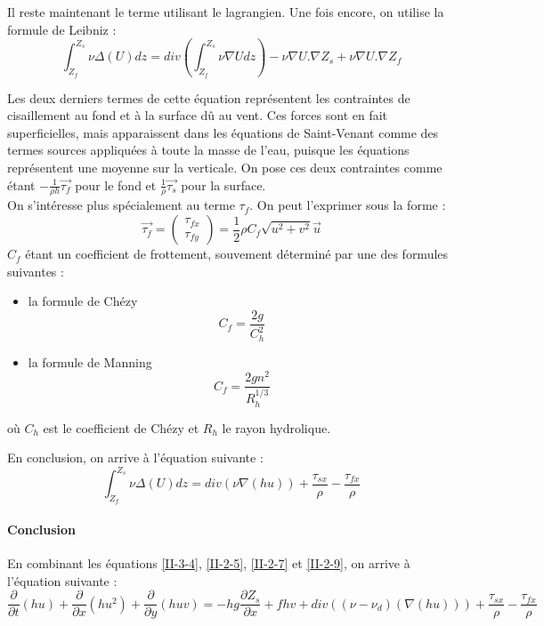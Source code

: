 \bigskip
Il reste maintenant le terme utilisant le lagrangien. Une fois encore, on utilise la formule de Leibniz :
\[\int_{Z_f}^{Z_s} \nu \Delta(U) dz = div\left( \int_{Z_f}^{Z_s} \nu \nabla U dz \right) - \nu \nabla U . \nabla Z_s + \nu \nabla U . \nabla Z_f\]

Les deux derniers termes de cette équation représentent les contraintes de cisaillement au fond et à la surface dû au vent. Ces forces sont en fait superficielles, mais apparaissent dans les équations de Saint-Venant comme des termes sources appliquées à toute la masse de l'eau, puisque les équations représentent une moyenne sur la verticale. On pose ces deux contraintes comme étant $-\frac{1}{\rho h}\overrightarrow{\tau_f}$ pour le fond et $\frac{1}{\rho}\overrightarrow{\tau_s}$ pour la surface. \\
On s'intéresse plus spécialement au terme $\tau_f$. On peut l'exprimer sous la forme :
	\[\overrightarrow{\tau_f}=\begin{pmatrix} \tau_{fx} \\ \tau_{fy} \end{pmatrix} = \frac{1}{2} \rho C_f \sqrt{u^2+v^2} \overrightarrow{u}\]
$C_f$ étant un coefficient de frottement, souvement déterminé par une des formules suivantes :
\begin{itemize}
	\item la formule de Chézy \[C_f = \frac{2g}{C_h^2}\]
	\item la formule de Manning \[C_f = \frac{2gn^2}{R_h^{1/3}}\]
\end{itemize}

où $C_h$ est le coefficient de Chézy et $R_h$ le rayon hydrolique. 

\bigskip
En conclusion, on arrive à l'équation suivante :
\begin{equation} \label{II-2-9}
	\int_{Z_f}^{Z_s} \nu \Delta(U) dz = div(\nu \nabla(hu)) + \frac{\tau_{sx}}{\rho} - \frac{\tau_{fx}}{\rho}
\end{equation}

\paragraph{Conclusion}
En combinant les équations \ref{II-3-4},  \ref{II-2-5}, \ref{II-2-7} et \ref{II-2-9}, on arrive à l'équation suivante :
\[\frac{\partial}{\partial t}(hu) + \frac{\partial}{\partial x} (hu^2) + \frac{\partial}{\partial y}(huv) = -hg\frac{\partial Z_s}{\partial x} + fhv + div((\nu-\nu_d)(\nabla(hu))) + \frac{\tau_{sx}}{\rho} - \frac{\tau_{fx}}{\rho}\]

